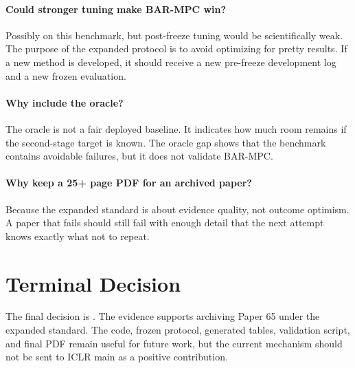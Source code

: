 \documentclass{article}
\newcommand{\method}{\textsc{BAR-MPC}}
\begin{document}
\paragraph{Could stronger tuning make \method{} win?}
Possibly on this benchmark, but post-freeze tuning would be scientifically weak. The purpose of the expanded protocol is to avoid optimizing for pretty results. If a new method is developed, it should receive a new pre-freeze development log and a new frozen evaluation.

\paragraph{Why include the oracle?}
The oracle is not a fair deployed baseline. It indicates how much room remains if the second-stage target is known. The oracle gap shows that the benchmark contains avoidable failures, but it does not validate \method{}.

\paragraph{Why keep a 25+ page PDF for an archived paper?}
Because the expanded standard is about evidence quality, not outcome optimism. A paper that fails should still fail with enough detail that the next attempt knows exactly what not to repeat.

\section{Terminal Decision}

The final decision is \PaperDecision{}. The evidence supports archiving Paper 65 under the expanded standard. The code, frozen protocol, generated tables, validation script, and final PDF remain useful for future work, but the current mechanism should not be sent to ICLR main as a positive contribution.



\end{document}
